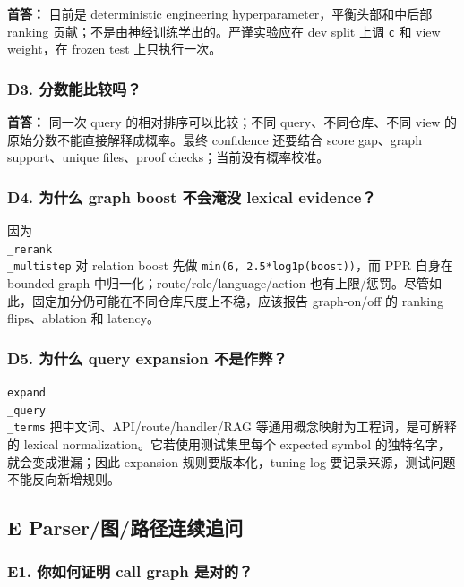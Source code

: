 \documentclass[UTF8,12pt,openany]{ctexbook}
\begin{document}
\textbf{首答：} 目前是 deterministic engineering hyperparameter，平衡头部和中后部 ranking 贡献；不是由神经训练学出的。严谨实验应在 dev split 上调 \texttt{c} 和 view weight，在 frozen test 上只执行一次。\par

\subsubsection{D3. 分数能比较吗？}

\textbf{首答：} 同一次 query 的相对排序可以比较；不同 query、不同仓库、不同 view 的原始分数不能直接解释成概率。最终 confidence 还要结合 score gap、graph support、unique files、proof checks；当前没有概率校准。\par

\subsubsection{D4. 为什么 graph boost 不会淹没 lexical evidence？}

因为 \texttt{\\_rerank\\_multistep} 对 relation boost 先做 \texttt{min(6, 2.5*log1p(boost))}，而 PPR 自身在 bounded graph 中归一化；route/role/language/action 也有上限/惩罚。尽管如此，固定加分仍可能在不同仓库尺度上不稳，应该报告 graph-on/off 的 ranking flips、ablation 和 latency。\par

\subsubsection{D5. 为什么 query expansion 不是作弊？}

\texttt{expand\\_query\\_terms} 把中文词、API/route/handler/RAG 等通用概念映射为工程词，是可解释的 lexical normalization。它若使用测试集里每个 expected symbol 的独特名字，就会变成泄漏；因此 expansion 规则要版本化，tuning log 要记录来源，测试问题不能反向新增规则。\par

\subsection{E Parser/图/路径连续追问}

\subsubsection{E1. 你如何证明 call graph 是对的？}
\end{document}

